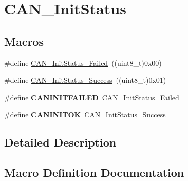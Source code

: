\hypertarget{group___c_a_n___init_status}{}\section{C\+A\+N\+\_\+\+Init\+Status}
\label{group___c_a_n___init_status}
\subsection*{Macros}
\begin{DoxyCompactItemize}
\item 
\#define \hyperlink{group___c_a_n___init_status_ga095c319e8c54c974eb2b6eeadf180d96}{C\+A\+N\+\_\+\+Init\+Status\+\_\+\+Failed}~((uint8\+\_\+t)0x00)
\item 
\#define \hyperlink{group___c_a_n___init_status_ga6bed5957af8f2f6b00568e15ccac5772}{C\+A\+N\+\_\+\+Init\+Status\+\_\+\+Success}~((uint8\+\_\+t)0x01)
\item 
\hypertarget{group___c_a_n___init_status_ga0539a9e5a898fcd71c4dcb7e341e4b86}{}\#define {\bfseries C\+A\+N\+I\+N\+I\+T\+F\+A\+I\+L\+E\+D}~\hyperlink{group___c_a_n___init_status_ga095c319e8c54c974eb2b6eeadf180d96}{C\+A\+N\+\_\+\+Init\+Status\+\_\+\+Failed}\label{group___c_a_n___init_status_ga0539a9e5a898fcd71c4dcb7e341e4b86}

\item 
\hypertarget{group___c_a_n___init_status_ga14cba0b5b506be73e2f45c732f8e54cb}{}\#define {\bfseries C\+A\+N\+I\+N\+I\+T\+O\+K}~\hyperlink{group___c_a_n___init_status_ga6bed5957af8f2f6b00568e15ccac5772}{C\+A\+N\+\_\+\+Init\+Status\+\_\+\+Success}\label{group___c_a_n___init_status_ga14cba0b5b506be73e2f45c732f8e54cb}

\end{DoxyCompactItemize}


\subsection{Detailed Description}


\subsection{Macro Definition Documentation}
\hypertarget{group___c_a_n___init_status_ga095c319e8c54c974eb2b6eeadf180d96}{}
